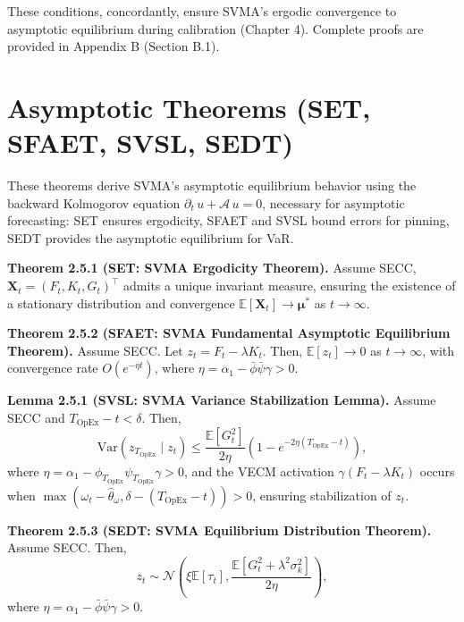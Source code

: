 \documentclass[12pt]{report}
\begin{document}
\vspace{0.2in}

These conditions, concordantly, ensure SVMA's ergodic convergence to asymptotic equilibrium during calibration (Chapter 4). Complete proofs are provided in Appendix B (Section B.1).
\section{Asymptotic Theorems (SET, SFAET, SVSL, SEDT)}
These theorems derive SVMA's asymptotic equilibrium behavior using the backward Kolmogorov equation \(\partial_t\,u + \mathcal{A}\,u = 0\), necessary for asymptotic forecasting: SET ensures ergodicity, SFAET and SVSL bound errors for pinning, SEDT provides the asymptotic equilibrium for VaR.

\vspace{0.2in}

\textbf{Theorem 2.5.1 (SET: SVMA Ergodicity Theorem).} Assume SECC, \(\mathbf{X}_t = (F_t, K_t, G_t)^\top\) admits a unique invariant measure, ensuring the existence of a stationary distribution and convergence \(\mathbb{E}[\mathbf{X}_t] \to \boldsymbol{\mu}^*\) as \(t \to \infty\).

\vspace{0.2in}

\textbf{Theorem 2.5.2 (SFAET: SVMA Fundamental Asymptotic Equilibrium Theorem).} Assume SECC. Let \( z_t = F_t - \lambda K_t \). Then, \(\mathbb{E}[z_t] \to 0\) as \( t \to \infty \), with convergence rate \( O(e^{-\eta t}) \), where \(\eta = \alpha_1 - \bar{\phi} \bar{\psi} \gamma > 0\).

\vspace{0.2in}

\textbf{Lemma 2.5.1 (SVSL: SVMA Variance Stabilization Lemma).} Assume SECC and \( T_{\text{OpEx}} - t < \delta \). Then,
\[
    \text{Var}(z_{T_{\text{OpEx}}} \mid z_t) \leq \frac{\mathbb{E}[G_t^2]}{2 \eta} \left(1 - e^{-2 \eta (T_{\text{OpEx}} - t)}\right),
\]
where \(\eta = \alpha_1 - \phi_{T_{\text{OpEx}}} \psi_{T_{\text{OpEx}}} \gamma > 0\), and the VECM activation \(\gamma (F_t - \lambda K_t)\) occurs when \(\max(\omega_t - \hat{\theta}_\omega, \delta - (T_{\text{OpEx}} - t)) > 0\), ensuring stabilization of \(z_t\).

\vspace{0.2in}

\textbf{Theorem 2.5.3 (SEDT: SVMA Equilibrium Distribution Theorem).} Assume SECC. Then,
\[
    z_t \sim \mathcal{N}\left(\xi \mathbb{E}[\tau_t], \frac{\mathbb{E}[G_t^2 + \lambda^2 \sigma_k^2]}{2 \eta}\right),
\]
where \(\eta = \alpha_1 - \bar{\phi} \bar{\psi} \gamma > 0\).
\end{document}
